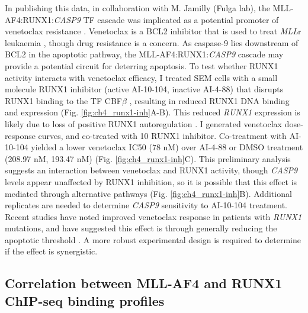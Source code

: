 In publishing this data, in collaboration with M. Jamilly (Fulga lab), the MLL-AF4:RUNX1:\textit{CASP9} TF cascade was implicated as a potential promoter of venetoclax resistance \citep{harman_kmt2a-aff1_2021}. Venetoclax is a BCL2 inhibitor that is used to treat \textit{MLL}r leukaemia \citep{khaw_venetoclax_2016, vandenberg_abt-199_2013}, though drug resistance is a concern. As caspase-9 lies downstream of BCL2 in the apoptotic pathway, the MLL-AF4:RUNX1:\textit{CASP9} cascade may provide a potential circuit for deterring apoptosis. To test whether RUNX1 activity interacts with venetoclax efficacy, I treated SEM cells with a small molecule RUNX1 inhibitor (active AI-10-104, inactive AI-4-88) that disrupts RUNX1 binding to the TF CBF$\beta$ \citep{illendula_small-molecule_2015, illendula_small_2016}, resulting in reduced RUNX1 DNA binding and expression (Fig. \ref{fig:ch4_runx1-inh}A-B). This reduced \textit{RUNX1} expression is likely due to loss of positive RUNX1 autoregulation \citep{martinez_transcriptional_2016}. I generated venetoclax dose-response curves, and co-treated with 10 \microm{} RUNX1 inhibitor. Co-treatment with AI-10-104 yielded a lower venetoclax IC50 (78 nM) over AI-4-88 or DMSO treatment (208.97 nM, 193.47 nM) (Fig. \ref{fig:ch4_runx1-inh}C). This preliminary analysis suggests an interaction between venetoclax and RUNX1 activity, though \textit{CASP9} levels appear unaffected by RUNX1 inhibition, so it is possible that this effect is mediated through alternative pathways (Fig. \ref{fig:ch4_runx1-inh}B). Additional replicates are needed to determine \textit{CASP9} sensitivity to AI-10-104 treatment. Recent studies have noted improved venetoclax response in patients with \textit{RUNX1} mutations, and have suggested this effect is through generally reducing the apoptotic threshold \citep{cherry_venetoclax_2021, chow_runx1_2021}. A more robust experimental design is required to determine if the effect is synergistic.

\subsection[Correlation between MLL-AF4 and RUNX1 ChIP-seq binding profiles]{\label{ch4:ma4-runx1-cor}Correlation between MLL-AF4 and RUNX1\\ChIP-seq binding profiles}

